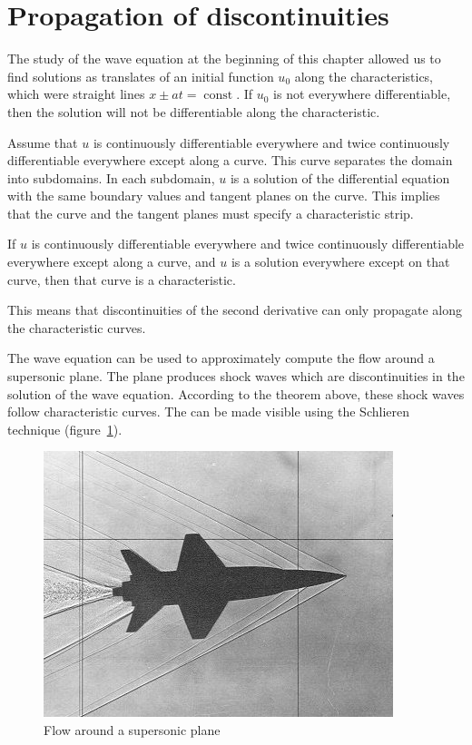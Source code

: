 %
%
%
\section{Propagation of discontinuities}
The study of the wave equation at the beginning of this chapter
allowed us to find solutions as translates of an initial function
$u_0$ along the characteristics, which were straight lines
$x\pm at=\operatorname{const}$.
If $u_0$ is not everywhere differentiable, then the solution will
not be differentiable along the characteristic.

Assume that $u$ is continuously differentiable everywhere
and twice continuously differentiable everywhere
except along a curve.
This curve separates the domain into subdomains.
In each subdomain, $u$ is a solution of the differential equation
with the same boundary values and tangent planes on the curve.
This implies that the curve and the tangent planes must
specify a characteristic strip.

\begin{satz}
If $u$ is continuously differentiable everywhere and twice
continuously differentiable everywhere except along a curve,
and $u$ is a solution everywhere except on that curve,
then that curve is a characteristic.
\end{satz}

This means that discontinuities of the second derivative
can only propagate along the characteristic curves.

The wave equation can be used to approximately compute the
flow around a supersonic plane.
The plane produces shock waves which are discontinuities in the
solution of the wave equation.
According to the theorem above, these shock waves follow
characteristic curves.
The can be made visible using the Schlieren technique
(figure~\ref{ueberschall2d}).

\begin{figure}
\begin{center}
\includegraphics[width=0.8\hsize]{../common/graphics/i-5-1}
\end{center}
\caption{Flow around a supersonic plane\label{ueberschall2d}}
\end{figure}

